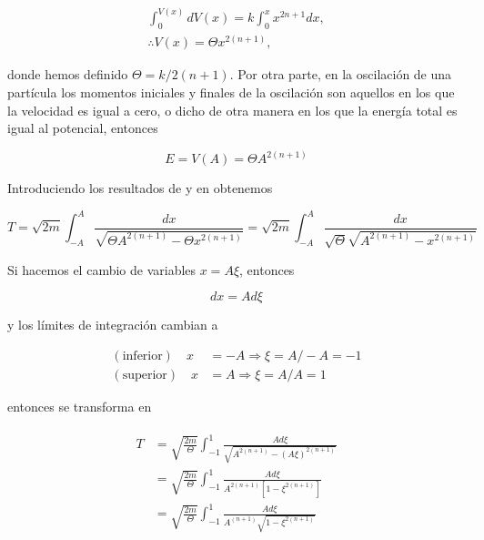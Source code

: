 \documentclass[a4paper,10pt]{article}
\numberwithin{equation}{section}
\begin{document}
\begin{gather}
 \int_{0}^{V(x)} dV(x) = k \int_0^x x^{2n+1} dx, \\
 \therefore V(x) = \Theta x^{2(n+1)},
 \label{eq:potencial2}
\end{gather}

donde hemos definido $\Theta = k/2(n+1)$. Por otra parte, en la oscilación de una partícula
los momentos iniciales y finales de la oscilación son aquellos en los que la velocidad es 
igual a cero, o dicho de otra manera en los que la energía total es igual al potencial,
entonces

\begin{equation}
 E = V(A) =  \Theta A^{2(n+1)}
 \label{eq:energTotal2}
\end{equation}

Introduciendo los resultados de  y  en 
 obtenemos

\begin{equation}
 T = \sqrt{2m} \int_{-A}^A \frac{dx}{\sqrt{\Theta A^{2(n+1)} - \Theta x^{2(n+1)}}} = 
 \sqrt{2m} \int_{-A}^A \frac{dx}{\sqrt{\Theta} \sqrt{A^{2(n+1)} - x^{2(n+1)}}}
 \label{eq:periodo2}
\end{equation}

Si hacemos el cambio de variables $x = A \xi$, entonces 

\begin{equation}
 dx = A d\xi
\end{equation}

y los límites de integración cambian a 

\begin{align*}
%
 (\text{inferior}) \quad x &= - A \Rightarrow \xi = A / -A = -1 \\
 (\text{superior}) \quad x &= A \Rightarrow \xi = A / A = 1
\end{align*}

entonces  se transforma en 

\begin{align}
 \begin{split}
  T &= \sqrt{\frac{2m}{\Theta}} \int_{-1}^1 \frac{A d\xi}{\sqrt{A^{2(n+1)} - (A\xi)^{2(n+1)}}} \\
    &= \sqrt{\frac{2m}{\Theta}} \int_{-1}^1 \frac{Ad\xi}{A^{2(n+1)}[1 - \xi^{2(n+1)}]} \\
    &= \sqrt{\frac{2m}{\Theta}} \int_{-1}^1 \frac{Ad\xi}{A^{(n+1)}\sqrt{1-\xi^{2(n+1)}}}
 \end{split}
\end{align}
\end{document}
